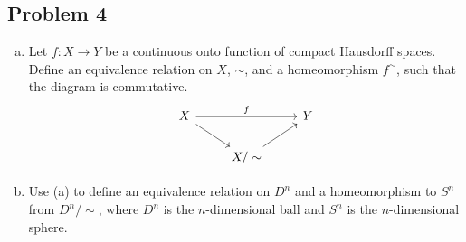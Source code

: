 \documentclass[12pt]{article}
\theoremstyle{definition}
\begin{document}
\subsection{Problem 4}
\begin{enumerate}[(a)]
    \item Let $f : X \to Y$ be a continuous onto function of compact Hausdorff spaces. Define an equivalence relation on $X$, $\sim$, and a homeomorphism $f^{\sim}$, such that the diagram is commutative.
    \[
        \begin{tikzcd}
            X \arrow[rr,"f"] \arrow[dr] &  & Y \\
             & X / \sim \arrow[ur] & 
        \end{tikzcd}
    \]
    \item Use (a) to define an equivalence relation on $D^n$ and a homeomorphism to $S^n$ from $D^n / \sim$, where $D^n$ is the $n$-dimensional ball and $S^n$ is the $n$-dimensional sphere.
\end{enumerate}
\end{document}
